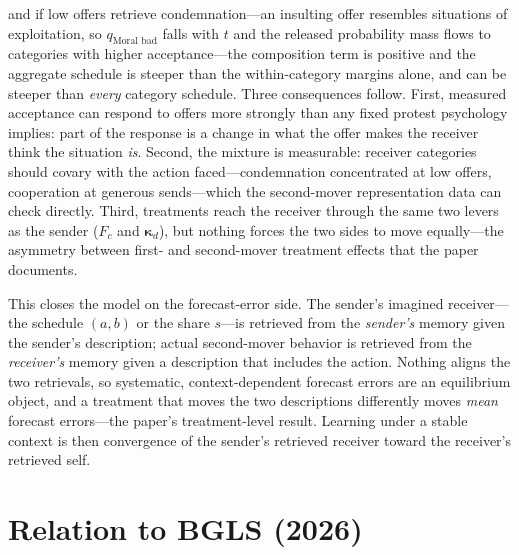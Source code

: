 \documentclass[11pt]{article}
\theoremstyle{plain}
\theoremstyle{remark}
\begin{document}
and if low offers retrieve condemnation---an insulting offer resembles situations of exploitation, so $q_{\text{Moral bad}}$ falls with $t$ and the released probability mass flows to categories with higher acceptance---the composition term is positive and the aggregate schedule is steeper than the within-category margins alone, and can be steeper than \emph{every} category schedule. Three consequences follow. First, measured acceptance can respond to offers more strongly than any fixed protest psychology implies: part of the response is a change in what the offer makes the receiver think the situation \emph{is}. Second, the mixture is measurable: receiver categories should covary with the action faced---condemnation concentrated at low offers, cooperation at generous sends---which the second-mover representation data can check directly. Third, treatments reach the receiver through the same two levers as the sender ($F_c$ and $\boldsymbol{\kappa}_d$), but nothing forces the two sides to move equally---the asymmetry between first- and second-mover treatment effects that the paper documents.

This closes the model on the forecast-error side. The sender's imagined receiver---the schedule $(a,b)$ or the share $s$---is retrieved from the \emph{sender's} memory given the sender's description; actual second-mover behavior is retrieved from the \emph{receiver's} memory given a description that includes the action. Nothing aligns the two retrievals, so systematic, context-dependent forecast errors are an equilibrium object, and a treatment that moves the two descriptions differently moves \emph{mean} forecast errors---the paper's treatment-level result. Learning under a stable context is then convergence of the sender's retrieved receiver toward the receiver's retrieved self.

\section{Relation to BGLS (2026)}
\label{sec:bgls}
\end{document}
